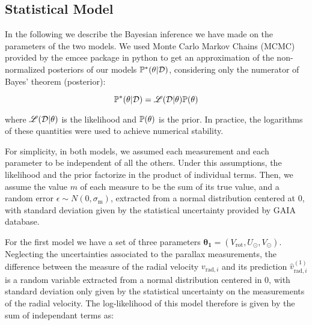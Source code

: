 \subsection{Statistical Model}\label{subsec:StatisticalModel}
In the following we describe the Bayesian inference we have made on the parameters of the two models. 
We used Monte Carlo Markov Chains (MCMC) provided by the emcee package in python 
to get an approximation of the non-normalized posteriors of our models 
$\mathbb{P}^{*}(\theta \vert \mathcal{D})$, considering only the numerator of Bayes' theorem (posterior):

\begin{equation}\label{Eq:NonNormPosterior}
    \mathbb{P}^{*}(\theta \vert \mathcal{D}) = \mathscr{L}(\mathcal{D} \vert \theta) \mathbb{P}(\theta)
\end{equation}

\noindent where $\mathscr{L}(\mathcal{D} \vert \theta)$ is the likelihood and $\mathbb{P}(\theta)$ is the prior. In practice, the logarithms of these quantities were used to achieve numerical stability.

For simplicity, in both models, we assumed each measurement and each parameter to be independent of all the others. 
Under this assumptions, the likelihood and the prior factorize in the product of individual terms. 
Then, we assume the value $m$ of each measure to be  the sum of its true value, 
and a random error $\epsilon \sim N(0, \sigma_\text{m})$, extracted from a normal distribution centered at 0, 
with standard deviation given by the statistical uncertainty provided by GAIA database.

For the first model we have a set of three parameters $\mathbf{\theta_1} = (V_{\text{rot}}, U_{\odot}, V_{\odot})$. 
Neglecting the uncertainties associated to the parallax measurements, 
the difference between the measure of the radial velocity $v_{\text{rad}, i}$ 
and its prediction $\hat{v}^{(1)}_{\text{rad}, i}$ is a random variable 
extracted from a normal distribution centered in 0, 
with standard deviation only given by the statistical uncertainty on the measurements of the radial velocity. 
The log-likelihood of this model therefore is given by the sum of independant terms as:

